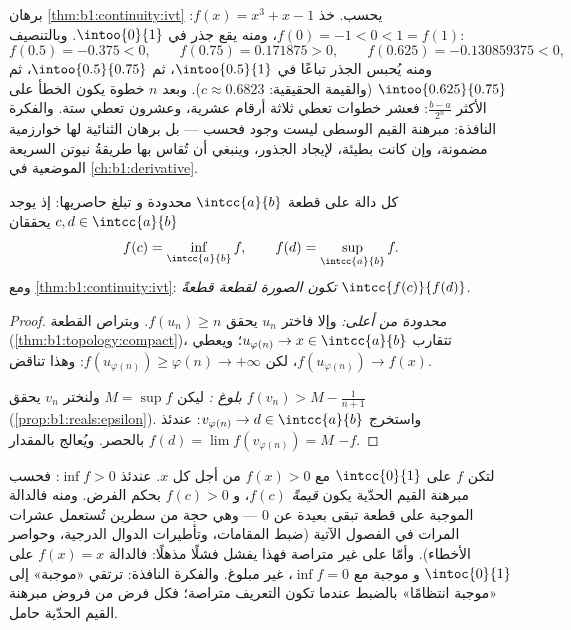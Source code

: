 \begin{example}\label{ex:b1:continuity:dichotomy}
برهان \cref{thm:b1:continuity:ivt} يحسب. خذ $f(x) =
x^3 + x - 1$: $f(0) = -1 < 0 < 1 = f(1)$، ومنه يقع جذر في
$\intoo{0}{1}$. وبالتنصيف:
\[
f(0.5) = -0.375 < 0, \qquad
f(0.75) = 0.171875 > 0, \qquad
f(0.625) = -0.130859375 < 0 ,
\]
ومنه يُحبس الجذر تباعًا في $\intoo{0.5}{1}$، ثم
$\intoo{0.5}{0.75}$، ثم $\intoo{0.625}{0.75}$ (والقيمة الحقيقية:
$c \approx 0.6823$). وبعد $n$ خطوة يكون الخطأ على الأكثر
$\frac{b - a}{2^n}$: فعشر خطوات تعطي ثلاثة أرقام عشرية، وعشرون تعطي
ستة. والفكرة النافذة: مبرهنة القيم الوسطى ليست
 وجود فحسب --- بل برهان الثنائية لها خوارزمية
مضمونة، وإن كانت بطيئة، لإيجاد الجذور، وينبغي أن تُقاس بها
طريقةُ نيوتن السريعة الموضعية في \cref{ch:b1:derivative}.
\end{example}

\begin{theorem}\label{thm:b1:continuity:evt}
كل دالة  على قطعة $\intcc{a}{b}$ محدودة و
تبلغ حاصريها: إذ يوجد $c, d \in \intcc{a}{b}$ يحققان
\[
f(c) = \inf_{\intcc{a}{b}} f,
\qquad
f(d) = \sup_{\intcc{a}{b}} f .
\]
ومع \cref{thm:b1:continuity:ivt}: \emph{تكون الصورة 
لقطعة قطعةً} $\intcc{f(c)}{f(d)}$.
\end{theorem}

\begin{proof}
\emph{محدودة من أعلى:} وإلا فاختر $u_n$ يحقق $f(u_n) \geq n$. وبتراص
القطعة (\cref{thm:b1:topology:compact})، تتقارب  $u_{\varphi(n)} \to x \in \intcc{a}{b}$؛ ويعطي 
$f(u_{\varphi(n)}) \to f(x)$، لكن $f(u_{\varphi(n)}) \geq \varphi(n)
\to +\infty$: وهذا تناقض.

\emph{بلوغ :} ليكن $M = \sup f$ ولنختر $v_n$ يحقق $f(v_n) >
M - \frac{1}{n+1}$ (\cref{prop:b1:reals:epsilon}). واستخرج
$v_{\varphi(n)} \to d \in \intcc{a}{b}$: عندئذ $f(d) = \lim
f(v_{\varphi(n)}) = M$ بالحصر. ويُعالج  بالمقدار
$-f$.
\end{proof}

\begin{example}\label{ex:b1:continuity:posmin}
لتكن $f$  على $\intcc{0}{1}$ مع $f(x) > 0$ من أجل
كل $x$. عندئذ $\inf f > 0$: فحسب مبرهنة القيم الحدّية يكون
 \emph{قيمةً} $f(c)$، و $f(c) > 0$ بحكم الفرض.
ومنه فالدالة  الموجبة على قطعة تبقى بعيدة
عن $0$ --- وهي حجة من سطرين تُستعمل عشرات المرات في
الفصول الآتية (ضبط المقامات، وتأطيرات الدوال
الدرجية، وحواصر الأخطاء). وأمّا على  غير متراصة فهذا يفشل
فشلًا مذهلًا: فالدالة $f(x) = x$ على $\intoc{0}{1}$  و
موجبة مع $\inf f = 0$، غير مبلوغ. والفكرة النافذة:
ترتقي «موجبة» إلى «موجبة انتظامًا» بالضبط عندما تكون
 التعريف متراصة؛ فكل فرض من فروض مبرهنة القيم الحدّية
حامل.
\end{example}

